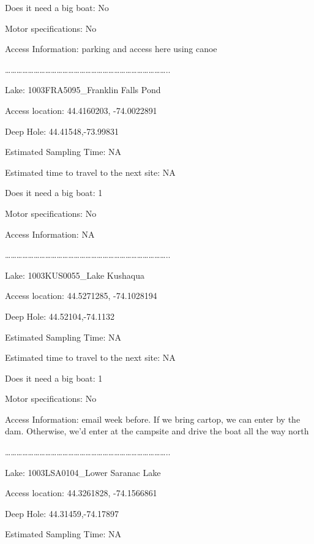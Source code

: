 \documentclass[]{article}
\begin{document}
Does it need a big boat: No

Motor specifications: No

Access Information: parking and access here using canoe

\ldots{}\ldots{}\ldots{}\ldots{}\ldots{}\ldots{}\ldots{}\ldots{}\ldots{}\ldots{}\ldots{}\ldots{}\ldots{}\ldots{}\ldots{}\ldots{}\ldots{}\ldots{}\ldots{}\ldots{}\ldots{}\ldots{}\ldots{}\ldots{}\ldots{}\ldots{}\ldots{}\ldots{}..

Lake: 1003FRA5095\_Franklin Falls Pond

Access location: 44.4160203, -74.0022891

Deep Hole: 44.41548,-73.99831

Estimated Sampling Time: NA

Estimated time to travel to the next site: NA

Does it need a big boat: 1

Motor specifications: No

Access Information: NA

\ldots{}\ldots{}\ldots{}\ldots{}\ldots{}\ldots{}\ldots{}\ldots{}\ldots{}\ldots{}\ldots{}\ldots{}\ldots{}\ldots{}\ldots{}\ldots{}\ldots{}\ldots{}\ldots{}\ldots{}\ldots{}\ldots{}\ldots{}\ldots{}\ldots{}\ldots{}\ldots{}\ldots{}..

Lake: 1003KUS0055\_Lake Kushaqua

Access location: 44.5271285, -74.1028194

Deep Hole: 44.52104,-74.1132

Estimated Sampling Time: NA

Estimated time to travel to the next site: NA

Does it need a big boat: 1

Motor specifications: No

Access Information: email week before. If we bring cartop, we can enter
by the dam. Otherwise, we'd enter at the campsite and drive the boat all
the way north

\ldots{}\ldots{}\ldots{}\ldots{}\ldots{}\ldots{}\ldots{}\ldots{}\ldots{}\ldots{}\ldots{}\ldots{}\ldots{}\ldots{}\ldots{}\ldots{}\ldots{}\ldots{}\ldots{}\ldots{}\ldots{}\ldots{}\ldots{}\ldots{}\ldots{}\ldots{}\ldots{}\ldots{}..

Lake: 1003LSA0104\_Lower Saranac Lake

Access location: 44.3261828, -74.1566861

Deep Hole: 44.31459,-74.17897

Estimated Sampling Time: NA
\end{document}
